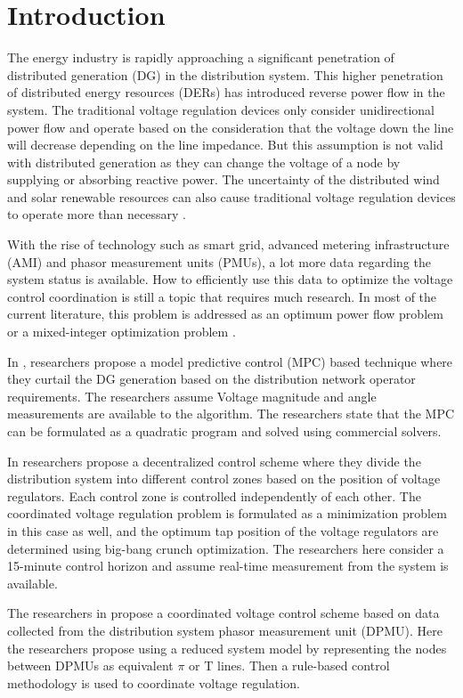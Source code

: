 \documentclass[Journal]{IEEEtran}
\begin{document}
\section{Introduction}
The energy industry is rapidly approaching a significant penetration of distributed generation (DG) in the distribution system. This higher penetration of distributed energy resources (DERs) has introduced reverse power flow in the system. The traditional voltage regulation devices only consider unidirectional power flow and operate based on the consideration that the voltage down the line will decrease depending on the line impedance. But this assumption is not valid with distributed generation as they can change the voltage of a node by supplying or absorbing reactive power. The uncertainty of the distributed wind and solar renewable resources can also cause traditional voltage regulation devices to operate more than necessary \cite{int1}.

With the rise of technology such as smart grid, advanced metering infrastructure (AMI) and phasor measurement units (PMUs), a lot more data regarding the system status is available. How to efficiently use this data to optimize the voltage control coordination is still a topic that requires much research. In most of the current literature, this problem is addressed as an optimum power flow problem or a mixed-integer optimization problem \cite{int2}. 

In \cite{NLR_1}, researchers propose a model predictive control (MPC) based technique where they curtail the DG generation based on the distribution network operator requirements. The researchers assume Voltage magnitude and angle measurements are available to the algorithm. The researchers state that the MPC can be formulated as a quadratic program and solved using commercial solvers.

In \cite{NLR_2} researchers propose a decentralized control scheme where they divide the distribution system into different control zones based on the position of voltage regulators. Each control zone is controlled independently of each other. The coordinated voltage regulation problem is formulated as a minimization problem in this case as well, and the optimum tap position of the voltage regulators are determined using big-bang crunch optimization. The researchers here consider a 15-minute control horizon and assume real-time measurement from the system is available.

The researchers in \cite{NLR_3} propose a coordinated voltage control scheme based on data collected from the distribution system phasor measurement unit (DPMU). Here the researchers propose using a reduced system model by representing the nodes between DPMUs as equivalent $\pi$ or T  lines. Then a rule-based control methodology is used to coordinate voltage regulation.  
\end{document}
